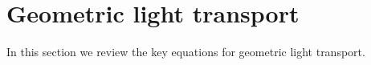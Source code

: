\section{Geometric light transport}
\label{sec,geom}

In this section we review the key equations for geometric light transport.

